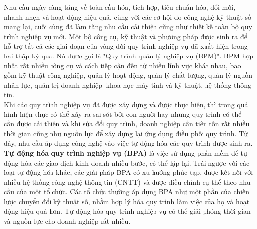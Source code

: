 Nhu cầu ngày càng tăng về toàn cầu hóa, tích hợp, tiêu chuẩn hóa, đổi mới, nhanh nhẹn và hoạt động hiệu quả, cùng với các cơ hội do công nghệ kỹ thuật số mang lại, cuối cùng đã làm tăng nhu cầu cải thiện  cũng như thiết kế toàn bộ quy trình nghiệp vụ mới. Một bộ công cụ, kỹ thuật và phương pháp được sinh ra để hỗ trợ tất cả các giai đoạn của vòng đời quy trình nghiệp vụ đã xuất hiện trong hai thập kỷ qua. Nó được gọi là "Quy trình quản lý nghiệp vụ (BPM)". BPM hợp nhất rất nhiều công cụ và cách tiếp cận đến từ nhiều lĩnh vực khác nhau, bao gồm kỹ thuật công nghiệp, quản lý hoạt động, quản lý chất lượng, quản lý nguồn nhân lực, quản trị doanh nghiệp, khoa học máy tính và kỹ thuật, hệ thống thông tin.\\

Khi các quy trình nghiệp vụ đã được xây dựng và được thực hiện, thì trong quá hình hiện thực có thể xảy ra sai sót bởi con người hay những quy trình có thể cần được cải thiện và khi sửa đổi quy trình, doanh nghiệp cần tiêu tốn rất nhiều thời gian cũng như nguồn lực để xây dựng lại ứng dụng điều phối quy trình. Từ đây, nhu cầu áp dụng công nghệ vào việc tự động hóa các quy trình được sinh ra. \textbf{Tự động hóa quy trình nghiệp vụ (BPA)} là việc sử dụng phần mềm để tự động hóa các giao dịch kinh doanh nhiều bước, có thể lặp lại. Trái ngược với các loại tự động hóa khác, các giải pháp BPA có xu hướng phức tạp, được kết nối với nhiều hệ thống công nghệ thông tin (CNTT) và được điều chỉnh cụ thể theo nhu cầu của một tổ chức. Các tổ chức thường áp dụng BPA như một phần của chiến lược chuyển đổi kỹ thuật số, nhằm hợp lý hóa quy trình làm việc của họ và hoạt động hiệu quả hơn. Tự động hóa quy trình nghiệp vụ có thể giải phóng thời gian và nguồn lực cho doanh nghiệp rất nhiều.\\

